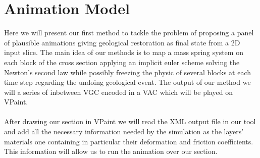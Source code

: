 \documentclass[12pt, a4paper]{memoir} %
\begin{document}
\chapter{Animation Model}
\label{ch:animationmodel}
Here we will present our first method to tackle the problem of proposing a panel of plausible animations giving geological restoration as final state from a 2D input slice. 
The main idea of our methods is to map a mass spring system on each block of the cross section applying an implicit euler scheme solving the Newton's second law while possibly freezing the physic of several blocks at each time step regarding the undoing geological event. The output of our method we will a series of inbetween VGC encoded in a VAC which will be played on VPaint.\\\\
After drawing our section in VPaint we will read the XML output file in our tool  and add all the necessary information needed by the simulation as the layers' materials one containing in particular their deformation and friction coefficients. This information will allow us to run the animation over our section.\\
\end{document}
